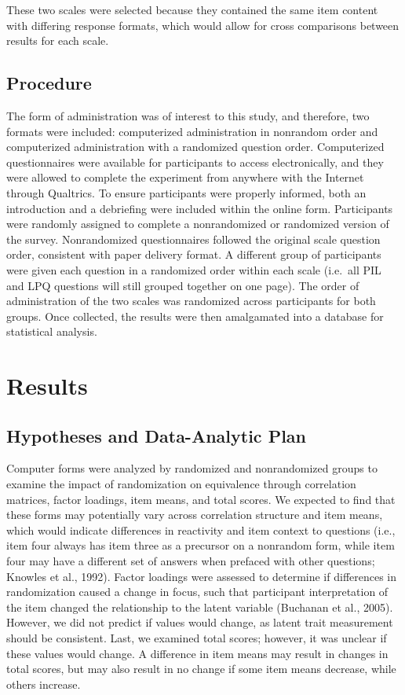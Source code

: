 \documentclass[english,man, mask]{apa6}
\theoremstyle{definition}
\theoremstyle{definition}
\theoremstyle{definition}
\theoremstyle{remark}
\begin{document}
These two scales were selected because they contained the same item
content with differing response formats, which would allow for cross
comparisons between results for each scale.

\subsection{Procedure}\label{procedure}

The form of administration was of interest to this study, and therefore,
two formats were included: computerized administration in nonrandom
order and computerized administration with a randomized question order.
Computerized questionnaires were available for participants to access
electronically, and they were allowed to complete the experiment from
anywhere with the Internet through Qualtrics. To ensure participants
were properly informed, both an introduction and a debriefing were
included within the online form. Participants were randomly assigned to
complete a nonrandomized or randomized version of the survey.
Nonrandomized questionnaires followed the original scale question order,
consistent with paper delivery format. A different group of participants
were given each question in a randomized order within each scale
(i.e.~all PIL and LPQ questions will still grouped together on one
page). The order of administration of the two scales was randomized
across participants for both groups. Once collected, the results were
then amalgamated into a database for statistical analysis.

\section{Results}\label{results}

\subsection{Hypotheses and Data-Analytic
Plan}\label{hypotheses-and-data-analytic-plan}

Computer forms were analyzed by randomized and nonrandomized groups to
examine the impact of randomization on equivalence through correlation
matrices, factor loadings, item means, and total scores. We expected to
find that these forms may potentially vary across correlation structure
and item means, which would indicate differences in reactivity and item
context to questions (i.e., item four always has item three as a
precursor on a nonrandom form, while item four may have a different set
of answers when prefaced with other questions; Knowles et al., 1992).
Factor loadings were assessed to determine if differences in
randomization caused a change in focus, such that participant
interpretation of the item changed the relationship to the latent
variable (Buchanan et al., 2005). However, we did not predict if values
would change, as latent trait measurement should be consistent. Last, we
examined total scores; however, it was unclear if these values would
change. A difference in item means may result in changes in total
scores, but may also result in no change if some item means decrease,
while others increase.
\end{document}
